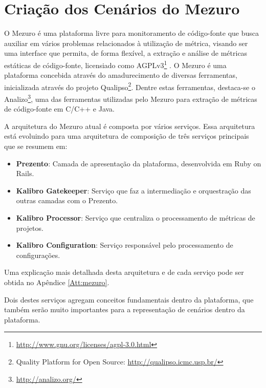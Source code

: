 \section{Criação dos Cenários do Mezuro}
\label{mezuro-cenarios}

O Mezuro é uma plataforma livre para monitoramento de código-fonte que busca auxiliar em vários problemas relacionados à utilização de métrica, visando ser uma interface que permita, de forma flexível, a extração e análise de métricas estáticas de código-fonte, licensiado como AGPLv3\footnote{\url{http://www.gnu.org/licenses/agpl-3.0.html}} \cite{manzo2014}. O Mezuro é uma plataforma concebida através do amadurecimento de diversas ferramentas, inicializada através do projeto Qualipso\footnote{Quality Platform for Open Source: \url{http://qualipso.icmc.usp.br/}}. Dentre estas ferramentas, destaca-se o Analizo\footnote{\url{http://analizo.org/}}, uma das ferramentas utilizadas pelo Mezuro para extração de métricas de código-fonte em C/C++ e Java.

A arquitetura do Mezuro atual é composta por vários serviços. Essa arquitetura está evoluindo para uma arquitetura de composição de três serviços principais que se resumem em:

\begin{itemize}
\item \textbf{Prezento}: Camada de apresentação da plataforma, desenvolvida em Ruby on Rails.

\item \textbf{Kalibro Gatekeeper}: Serviço que faz a intermediação e orquestração das outras camadas com o Prezento.

\item \textbf{Kalibro Processor}: Serviço que centraliza o processamento de métricas de projetos.

\item \textbf{Kalibro Configuration}: Serviço responsável pelo processamento de configurações.
\end{itemize}

Uma explicação mais detalhada desta arquitetura e de cada serviço pode ser obtida no Apêndice \ref{Att:mezuro}.

Dois destes serviços agregam conceitos fundamentais dentro da plataforma, que também serão muito importantes para a representação de cenários dentro da plataforma. 


